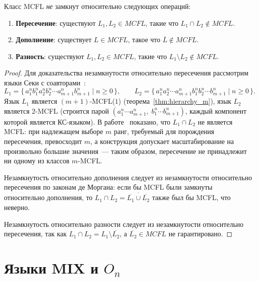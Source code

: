 \begin{theorem}
    \label{thm:mcf_nonclosure}
    Класс MCFL \emph{не} замкнут относительно следующих операций:
    \begin{enumerate}
        \item \textbf{Пересечение}: существуют $L_1, L_2 \in MCFL$, такие что $L_1 \cap L_2 \notin MCFL$.
        \item \textbf{Дополнение}: существует $L \in MCFL$, такое что $\overline{L} \notin MCFL$.
        \item \textbf{Разность}: существуют $L_1, L_2 \in MCFL$, такие что $L_1 \setminus L_2 \notin MCFL$.
    \end{enumerate}
\end{theorem}

\begin{proof}
    Для доказательства незамкнутости относительно пересечения рассмотрим языки Секи с соавторами~:
    \[
    L_1 = \{\,a_1^n b_1^n a_2^n b_2^n \cdots a_{m+1}^n b_{m+1}^n \mid n \ge 0\,\}, \qquad
    L_2 = \{\,a_1^n a_2^n \cdots a_{m+1}^n b_1^n b_2^n \cdots b_{m+1}^n \mid n \ge 0\,\}.
    \]
    Язык $L_1$ является $(m+1)$-MCFL($1$) (теорема~\ref{thm:hierarchy_m}), язык $L_2$ является $2$-MCFL (строится парой $(a_1^n\cdots a_{m+1}^n,\; b_1^n\cdots b_{m+1}^n)$, каждый компонент которой является КС-языком).
    В работе~ показано, что $L_1 \cap L_2$ не является MCFL: при надлежащем выборе $m$ ранг, требуемый для порождения пересечения, превосходит $m$, а конструкция допускает масштабирование на произвольно большие значения~--- таким образом, пересечение не принадлежит ни одному из классов $m$-MCFL.

    Незамкнутость относительно дополнения следует из незамкнутости относительно пересечения по законам де Моргана:
    если бы MCFL были замкнуты относительно дополнения, то $L_1 \cap L_2 = \overline{\overline{L_1} \cup \overline{L_2}}$ также был бы MCFL, что неверно.

    Незамкнутость относительно разности следует из незамкнутости относительно пересечения, так как $L_1 \cap L_2 = L_1 \setminus \overline{L_2}$, а $\overline{L_2} \in MCFL$ не гарантировано.
\end{proof}

\section{Языки MIX и $O_n$}

